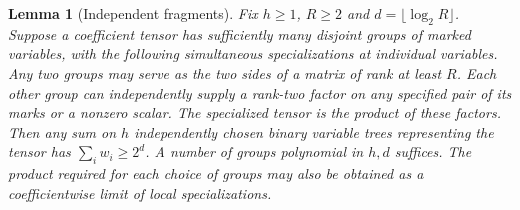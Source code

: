 \documentclass[11pt]{article}
\newtheorem{lemma}[theorem]{Lemma}
\theoremstyle{definition}
\begin{document}
\begin{lemma}[Independent fragments]\label{lem:fragments}
Fix \(h\ge1\), \(R\ge2\) and \(d=\lfloor\log_2 R\rfloor\). Suppose a coefficient tensor has sufficiently many disjoint groups of marked variables, with the following simultaneous specializations at individual variables. Any two groups may serve as the two sides of a matrix of rank at least \(R\). Each other group can independently supply a rank-two factor on any specified pair of its marks or a nonzero scalar. The specialized tensor is the product of these factors. Then any sum on \(h\) independently chosen binary variable trees representing the tensor has \(\sum_i w_i\ge2^d\). A number of groups polynomial in \(h,d\) suffices. The product required for each choice of groups may also be obtained as a coefficientwise limit of local specializations.
\end{lemma}
\end{document}
